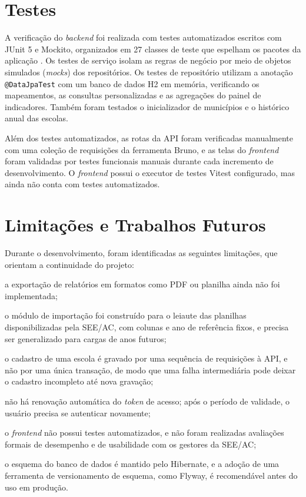 \section{Testes}

A verificação do \textit{backend} foi realizada com testes automatizados escritos com JUnit 5 e Mockito, organizados em 27 classes de teste que espelham os pacotes da aplicação \cite{sommerville2019}. Os testes de serviço isolam as regras de negócio por meio de objetos simulados (\textit{mocks}) dos repositórios. Os testes de repositório utilizam a anotação \texttt{@DataJpaTest} com um banco de dados H2 em memória, verificando os mapeamentos, as consultas personalizadas e as agregações do painel de indicadores. Também foram testados o inicializador de municípios e o histórico anual das escolas.

Além dos testes automatizados, as rotas da API foram verificadas manualmente com uma coleção de requisições da ferramenta Bruno, e as telas do \textit{frontend} foram validadas por testes funcionais manuais durante cada incremento de desenvolvimento. O \textit{frontend} possui o executor de testes Vitest configurado, mas ainda não conta com testes automatizados.

\section{Limitações e Trabalhos Futuros}

Durante o desenvolvimento, foram identificadas as seguintes limitações, que orientam a continuidade do projeto:

\begin{alineas}
  \item a exportação de relatórios em formatos como PDF ou planilha ainda não foi implementada;
  \item o módulo de importação foi construído para o leiaute das planilhas disponibilizadas pela SEE/AC, com colunas e ano de referência fixos, e precisa ser generalizado para cargas de anos futuros;
  \item o cadastro de uma escola é gravado por uma sequência de requisições à API, e não por uma única transação, de modo que uma falha intermediária pode deixar o cadastro incompleto até nova gravação;
  \item não há renovação automática do \textit{token} de acesso; após o período de validade, o usuário precisa se autenticar novamente;
  \item o \textit{frontend} não possui testes automatizados, e não foram realizadas avaliações formais de desempenho e de usabilidade com os gestores da SEE/AC;
  \item o esquema do banco de dados é mantido pelo Hibernate, e a adoção de uma ferramenta de versionamento de esquema, como Flyway, é recomendável antes do uso em produção.
\end{alineas}
